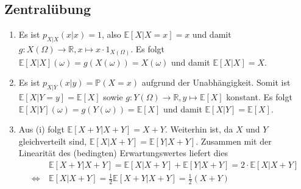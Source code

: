 \documentclass[a4paper]{article}
\begin{document}
\makeexheaderger

\subsection{Zentralübung}

\begin{enumerate}
    \item Es ist $p_{X|X}(x|x) = 1$, also $\mathds{E}[X|X=x] = x$ und damit $g: X(\Omega) \to \mathds{R}, x \mapsto x \cdot 1_{X(\Omega)}$. Es folgt $\mathds{E}[X|X](\omega) = g(X(\omega)) = X(\omega)$ und damit $\mathds{E}[X|X] = X$.
    \item Es ist $p_{X|Y}(x|y) = \mathds{P}(X = x)$ aufgrund der Unabhängigkeit. Somit ist $\mathds{E}[X|Y=y] = \mathds{E}[X]$ sowie $g: Y(\Omega) \to \mathds{R}, y \mapsto \mathds{E}[X]$ konstant. Es folgt $\mathds{E}[X|Y](\omega) = g(Y(\omega)) = \mathds{E}[X]$ und damit $\mathds{E}[X|Y] = \mathds{E}[X]$.
    \item Aus (i) folgt $\mathds{E}[X + Y | X + Y] = X + Y$. Weiterhin ist, da $X$ und $Y$ gleichverteilt sind, $\mathds{E}[X | X + Y] = \mathds{E}[Y | X + Y]$. Zusammen mit der Linearität des (bedingten) Erwartungswertes liefert dies
    \begin{align*}
        &\mathds{E}[X + Y | X + Y] = \mathds{E}[X| X + Y] + \mathds{E}[ Y | X + Y] = 2 \cdot \mathds{E}[X| X + Y] \\ \iff \ &\mathds{E}[X| X + Y] = \frac{1}{2} \mathds{E}[X + Y | X + Y] = \frac{1}{2} (X + Y)
    \end{align*}
\end{enumerate}

\subsection{}

\subsection{}
\end{document}
